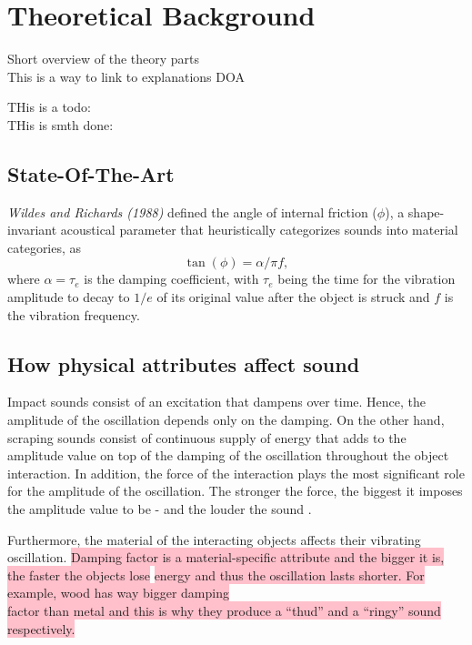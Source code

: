 \chapter{Theoretical Background}\label{ch:theory}
Short overview of the theory parts\\
This is a way to link to explanations \gls{DOA} 

THis is a todo: 
\\
THis is smth done:
\done{}

\section{State-Of-The-Art}\label{sec:state_art}
\textit{Wildes and Richards (1988)} defined the angle of internal friction ($\phi$), a shape-invariant acoustical parameter that heuristically categorizes sounds into material categories, as
\begin{equation}
\tan(\phi) = \alpha / \pi f,
\end{equation}
where $\alpha = \tau_e$ is the damping coefficient, with $\tau_e$ being the time for the vibration amplitude to decay to $1/e$ of its original value after the object is struck  and $f$ is the vibration frequency\cite{giordano2006material}.

\section{How physical attributes affect sound}
\colorbox{pink}{}

Impact sounds consist of an excitation that dampens over time. Hence, the amplitude of the oscillation depends only on the damping. On the other hand, scraping sounds consist of continuous supply of energy that adds to the amplitude value on top of the damping of the oscillation throughout the object interaction. In addition, the force of the interaction plays the most significant role for the amplitude of the oscillation. The stronger the force, the biggest it imposes the amplitude value to be - and the louder the sound \cite{gaver1993world}.

Furthermore, the material of the interacting objects affects their vibrating oscillation. \colorbox{pink}{Damping factor is a material-specific attribute and the bigger it is, the faster the objects lose} \colorbox{pink}{energy and thus the oscillation lasts shorter. For example, wood has way bigger damping}\\ \colorbox{pink}{factor than metal and this is why they produce a ``thud'' and a ``ringy'' sound respectively. }

